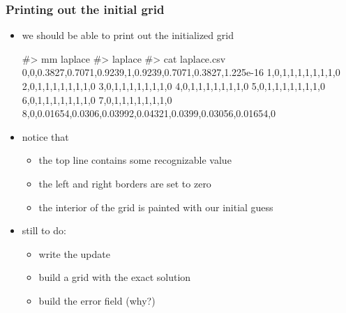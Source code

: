 \begin{frame}[fragile]
%
  \frametitle{Printing out the initial grid}
%
  \begin{itemize}
  \item we should be able to print out the initialized grid
%
  \begin{shell}{}
#> mm laplace
#> laplace
#> cat laplace.csv
0,0,0.3827,0.7071,0.9239,1,0.9239,0.7071,0.3827,1.225e-16
1,0,1,1,1,1,1,1,1,0
2,0,1,1,1,1,1,1,1,0
3,0,1,1,1,1,1,1,1,0
4,0,1,1,1,1,1,1,1,0
5,0,1,1,1,1,1,1,1,0
6,0,1,1,1,1,1,1,1,0
7,0,1,1,1,1,1,1,1,0
8,0,0.01654,0.0306,0.03992,0.04321,0.0399,0.03056,0.01654,0
  \end{shell}
%
  \item notice that
    \begin{itemize}
    \item the top line contains some recognizable value
    \item the left and right borders are set to zero
    \item the interior of the grid is painted with our initial guess
    \end{itemize}
%
  \item still to do:
    \begin{itemize}
    \item write the update
    \item build a grid with the exact solution 
    \item build the error field (why?)
    \end{itemize}
  \end{itemize}
%
\end{frame}

